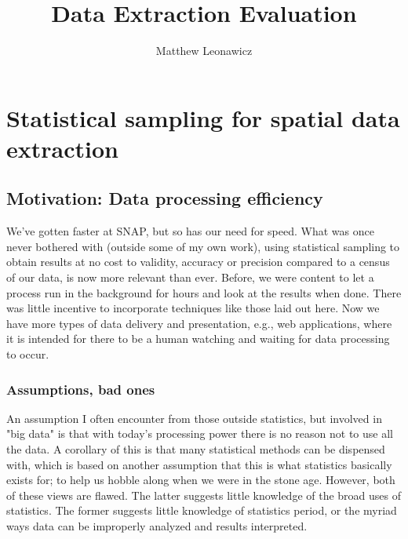 \documentclass{article}\usepackage[]{graphicx}\usepackage[]{color}
\begin{document}
\title{Data Extraction Evaluation}
\author{Matthew Leonawicz}
\maketitle



\section{Statistical sampling for spatial data extraction}

\subsection{Motivation: Data processing efficiency}

We've gotten faster at SNAP, but so has our need for speed. What was once never bothered with (outside some of my own work),
using statistical sampling to obtain results at no cost to validity, accuracy or precision compared to a census of our data,
is now more relevant than ever.
Before, we were content to let a process run in the background for hours and look at the results when done.
There was little incentive to incorporate techniques like those laid out here.
Now we have more types of data delivery and presentation, e.g., web applications, where it is intended for there to be a human watching and waiting for data processing to occur.

\subsubsection{Assumptions, bad ones}
An assumption I often encounter from those outside statistics, but involved in "big data" is that with today's processing power there is no reason not to use all the data.
A corollary of this is that many statistical methods can be dispensed with,
which is based on another assumption that this is what statistics basically exists for;
to help us hobble along when we were in the stone age.
However, both of these views are flawed.
The latter suggests little knowledge of the broad uses of statistics.
The former suggests little knowledge of statistics period, or the myriad ways data can be improperly analyzed and results interpreted.
\end{document}
